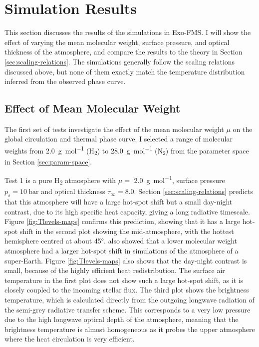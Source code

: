 


\section{Simulation Results}\label{sec:results-linking}

This section discusses the results of the simulations in Exo-FMS. I will show the effect of varying the mean molecular weight, surface pressure, and optical thickness of the atmosphere, and compare the results to the theory in Section \ref{sec:scaling-relations}. The simulations generally follow the scaling relations discussed above, but none of them exactly match the temperature distribution inferred from the observed phase curve.

\subsection{Effect of Mean Molecular Weight}\label{sec:mmw_effect}

The first set of tests investigate the effect of the mean molecular weight $\mu$ on the global circulation and thermal phase curve. I selected a range of molecular weights from \SI{2.0}{\gram\per\mol} (H\textsubscript{2}) to \SI{28.0}{\gram\per\mol} (N\textsubscript{2}) from the parameter space in Section \ref{sec:param-space}.

Test 1 is a pure H\textsubscript{2} atmosphere with $\mu =$ \SI{2.0}{\gram\per\mol}, surface pressure $p_{s} = 10\ \mathrm{bar}$ and optical thickness $\tau_{\infty}= 8.0$. Section \ref{sec:scaling-relations} predicts that this atmosphere will have a large hot-spot shift but a small day-night contrast, due to its high specific heat capacity, giving a long radiative timescale. Figure \ref{fig:Tlevels-maps} confirms this prediction, showing that it has a large hot-spot shift in the second plot showing the mid-atmosphere, with the hottest hemisphere centred at about \ang{45}. \citet{kataria2014atmospheric} also showed that a lower molecular weight atmosphere had a larger hot-spot shift in simulations of the atmosphere of a super-Earth. Figure \ref{fig:Tlevels-maps} also shows that the day-night contrast is small, because of the highly efficient heat redistribution. The surface air temperature in the first plot does not show such a large hot-spot shift, as it is closely coupled to the incoming stellar flux. The third plot shows the brightness temperature, which is calculated directly from the outgoing longwave radiation of the semi-grey radiative transfer scheme. This corresponds to a very low pressure due to the high longwave optical depth of the atmosphere, meaning that the brightness temperature is almost homogeneous as it probes the upper atmosphere where the heat circulation is very efficient.


